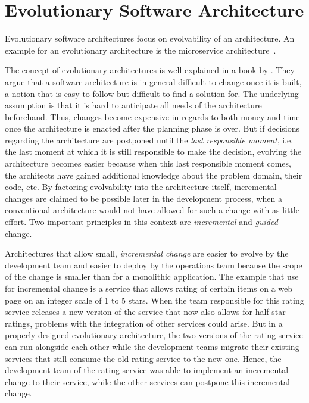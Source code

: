 \section{Evolutionary Software Architecture}
\label{sec:fundamentals:evolutionary}

Evolutionary software architectures focus on evolvability of an architecture.
An example for an evolutionary architecture is the microservice architecture~\cite{WEB:EvolArch:2016}.

The concept of evolutionary architectures is well explained in a book by \citet{ford2017building}.
They argue that a software architecture is in general difficult to change once it is built, a notion that is easy to follow but difficult to find a solution for.
The underlying assumption is that it is hard to anticipate all needs of the architecture beforehand.
Thus, changes become expensive in regards to both money and time once the architecture is enacted after the planning phase is over.
But if decisions regarding the architecture are postponed until the \emph{last responsible moment}, i.e. the last moment at which it is still responsible to make the decision, evolving the architecture becomes easier because when this last responsible moment comes, the architects have gained additional knowledge about the problem domain, their code, etc.
By factoring evolvability into the architecture itself, incremental changes are claimed to be possible later in the development process, when a conventional architecture would not have allowed for such a change with as little effort.
Two important principles in this context are \emph{incremental} and \emph{guided} change.

Architectures that allow small, \emph{incremental change} are easier to evolve by the development team and easier to deploy by the operations team because the scope of the change is smaller than for a monolithic application.
The example that \citeauthor{ford2017building} use for incremental change is a service that allows rating of certain items on a web page on an integer scale of 1 to 5 stars.
When the team responsible for this rating service releases a new version of the service that now also allows for half-star ratings, problems with the integration of other services could arise.
But in a properly designed evolutionary architecture, the two versions of the rating service can run alongside each other while the development teams migrate their existing services that still consume the old rating service to the new one.
Hence, the development team of the rating service was able to implement an incremental change to their service, while the other services can postpone this incremental change.

